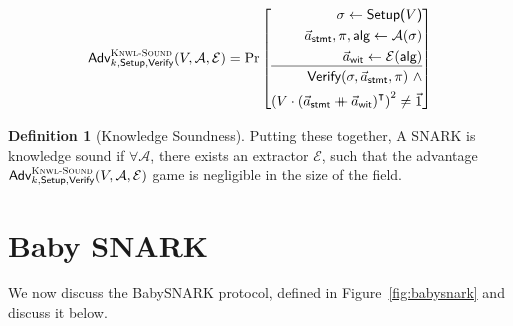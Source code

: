 \documentclass{article}
\theoremstyle{definition}
\newtheorem{definition}{Definition}[section]
\theoremstyle{remark}
\newcommand{\Adv}{\mathcal{A}}
\newcommand{\Ext}{\mathcal{E}}
\newcommand{\mdoubleplus}{\ensuremath{\mathbin{+\mkern-10mu+}}}
\begin{document}
  \[
  \textsf{Adv}^{\textsc{Knwl-Sound}}_{k,\textsf{Setup},\textsf{Verify}}(V, \Adv, \Ext) =
  \Pr \left[
    \begin{aligned}
    \sigma \leftarrow \textsf{Setup($V$)}\\
    \vec{a}_{\textsf{stmt}}, \pi, \textsf{alg} \leftarrow \Adv(\sigma)\\
    \vec{a}_{\textsf{wit}} \leftarrow \Ext(\textsf{alg}) \\
    \hline  ~\\[-13pt]
    \textsf{Verify}(\sigma, \vec{a}_\textsf{stmt}, \pi) ~\land \\
    \left( V\cdot \left( \vec{a}_{\textsf{stmt}} \mdoubleplus \vec{a}_\textsf{wit} \right)^\intercal \right)^2 \neq \vec{1} 
    \end{aligned}
  \right]
  \]

\begin{definition}[Knowledge Soundness]
Putting these together, A SNARK is knowledge sound if $\forall \Adv$, there exists an extractor $\Ext$, such that the advantage  $\textsf{Adv}^{\textsc{Knwl-Sound}}_{k,\textsf{Setup},\textsf{Verify}}(V, \Adv, \Ext)$ game is negligible in the size of the field.
\end{definition}

\section{Baby SNARK}
We now discuss the BabySNARK protocol, defined in Figure~\ref{fig:babysnark}
and discuss it below.
\end{document}
